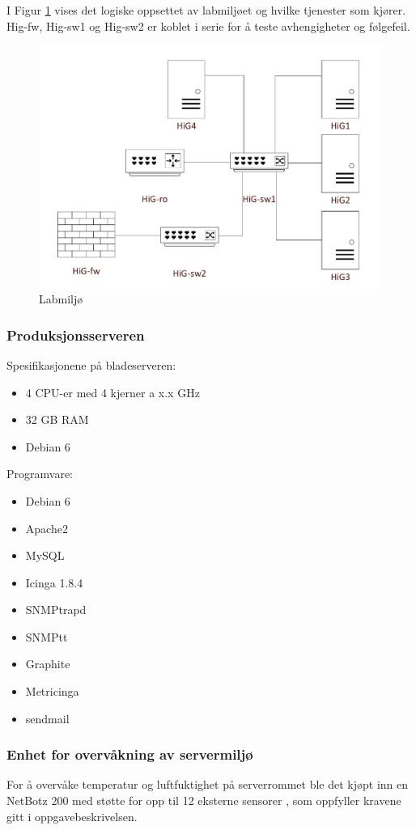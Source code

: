 I Figur \ref{laboppsett} vises det logiske oppsettet av labmiljøet og hvilke tjenester som kjører. Hig-fw, Hig-sw1 og Hig-sw2 er koblet i serie for å teste avhengigheter og følgefeil.

\begin{figure}
    \centering
    \includegraphics[scale=0.4]{img/labmiljo}
    \caption{Labmiljø}
    \label{laboppsett}
\end{figure}


\subsubsection{Produksjonsserveren}
Spesifikasjonene på bladeserveren:
\begin{itemize}
\item 4 CPU-er med 4 kjerner a x.x GHz
\item 32 GB RAM
\item Debian 6
\end{itemize}
Programvare:
\begin{itemize}
\item Debian 6
\item Apache2
\item MySQL
\item Icinga 1.8.4
\item SNMPtrapd
\item SNMPtt
\item Graphite
\item Metricinga 
\item sendmail
\end{itemize}
\subsubsection{Enhet for overvåkning av servermiljø}
For å overvåke temperatur og luftfuktighet på serverrommet ble det kjøpt inn en NetBotz 200 med støtte for opp til 12 eksterne sensorer \cite{netbotz},
som oppfyller kravene gitt i oppgavebeskrivelsen. 

